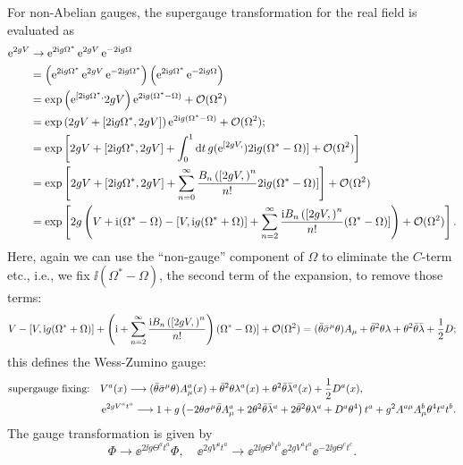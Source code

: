 \documentclass[CheatSheet]{subfiles}
\begin{document}
For non-Abelian gauges, the supergauge transformation for the real field is evaluated as
\begin{align}
  \ee^{2g V}
&\to
\ee^{2\ii g \Omega^{*}}
 \ee^{2g V}
\ee^{-2\ii g \Omega}
\\&=
\left(\ee^{2\ii g\Omega^*}\ee^{2g V}\ee^{-2\ii g\Omega^*}\right)
\left(\ee^{2\ii g\Omega^*}\ee^{-2\ii g\Omega}\right)
\\&=\exp\left(\ee^{[2\ii g\Omega^*,}2gV\right)\ee^{2\ii g(\Omega^*-\Omega)}+\Order(\Omega^2)
\\&=\exp\left(2gV+[2\ii g\Omega^*,2gV]\right)\ee^{2\ii g(\Omega^*-\Omega)}+\Order(\Omega^2);
\\&=\exp\left[
2gV+[2\ii g\Omega^*,2gV] + \int_0^1\dd t\,g(\ee^{[2gV,})2\ii g(\Omega^*-\Omega)]+\Order(\Omega^2)
\right]
\\&=\exp\left[
2gV+[2\ii g\Omega^*,2gV] + \sum_{n=0}^{\infty}\frac{B_n\left([2gV,\right)^n}{n!}2\ii g(\Omega^*-\Omega)]
\right]+\Order(\Omega^2)
\\&=\exp\left[
2g\left(
V + \ii (\Omega^*-\Omega) - [V,\ii g(\Omega^*+\Omega)]+
 \sum_{n=2}^{\infty}\frac{\ii B_n\left([2gV,\right)^n}{n!} (\Omega^*-\Omega)]
\right)+\Order(\Omega^2)
\right].
\end{align}
Here, again we can use the ``non-gauge'' component of $\Omega$ to eliminate the $C$-term etc., i.e., we fix $\ii(\Omega^*-\Omega)$, the second term of the expansion, to remove those terms:
\begin{equation}
 V - [V,\mathrm{i} g(\Omega^*+\Omega)]+
 \left(\mathrm{i}+
\sum_{n=2}^{\infty}\frac{\mathrm{i} B_n\left([2gV,\right)^n}{n!}\right) (\Omega^*-\Omega)]+\operatorname{\mathcal{O}}(\Omega^2)
=(\bar\theta\bar\sigma^{\mu}\theta)A_{\mu}+\bar\theta^2\theta\lambda+\theta^2\bar\theta\bar{\lambda}+\frac{1}{2}D;
\end{equation}
this defines the Wess-Zumino gauge:
\begin{align}
 \text{supergauge fixing:}\quad &V^a(x)\longrightarrow(\bar\theta\bar\sigma^{\mu}\theta)A^a_{\mu}(x)+\bar\theta^2\theta\lambda^a(x)+\theta^2\bar\theta\bar{\lambda}^a(x)+\frac{1}{2}D^a(x),
\\
& \mathop{}\!\mathrm{e}^{2gV^at^a}\longrightarrow
 1 +g\left(
  - 2\theta \sigma^{\mu}\bar\theta A^a_{\mu} +2\theta^2\bar\theta \bar\lambda^a+2\bar\theta^2\theta\lambda^a
  + D^a\theta^4
\right)t^a
 +g^2A^{a\mu} A^b_\mu\theta^4t^at^b.
\end{align}
The gauge transformation is given by
\begin{equation}
  \Phi\to \ee^{2\ii g \Theta^at^a}\Phi,
\quad
  \ee^{2g V^at^a}\to\ee^{2\ii g \Theta^bt^b} \ee^{2g V^at^a}\ee^{-2\ii g \Theta^ct^c}.
\end{equation}
\end{document}
